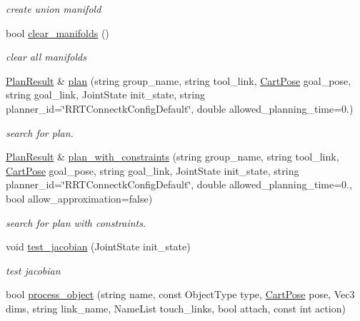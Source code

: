 \begin{DoxyCompactItemize}
\begin{DoxyCompactList}\small\item\em create union manifold \end{DoxyCompactList}\item 
bool \hyperlink{class_r_n_b_1_1_moveit_compact_1_1_planner_aac7f1dd0ef403cf9dfaa81de8a355cbe}{clear\+\_\+manifolds} ()
\begin{DoxyCompactList}\small\item\em clear all manifolds \end{DoxyCompactList}\item 
\hyperlink{struct_r_n_b_1_1_moveit_compact_1_1_plan_result}{Plan\+Result} \& \hyperlink{class_r_n_b_1_1_moveit_compact_1_1_planner_a8600287d3616809c9587ce6e5bfe1861}{plan} (string group\+\_\+name, string tool\+\_\+link, \hyperlink{class_r_n_b_1_1_moveit_compact_1_1_cart_pose}{Cart\+Pose} goal\+\_\+pose, string goal\+\_\+link, Joint\+State init\+\_\+state, string planner\+\_\+id=\char`\"{}R\+R\+T\+Connectk\+Config\+Default\char`\"{}, double allowed\+\_\+planning\+\_\+time=0.)
\begin{DoxyCompactList}\small\item\em search for plan. \end{DoxyCompactList}\item 
\hyperlink{struct_r_n_b_1_1_moveit_compact_1_1_plan_result}{Plan\+Result} \& \hyperlink{class_r_n_b_1_1_moveit_compact_1_1_planner_a99f5b838a94452a04b5ea15ad6273026}{plan\+\_\+with\+\_\+constraints} (string group\+\_\+name, string tool\+\_\+link, \hyperlink{class_r_n_b_1_1_moveit_compact_1_1_cart_pose}{Cart\+Pose} goal\+\_\+pose, string goal\+\_\+link, Joint\+State init\+\_\+state, string planner\+\_\+id=\char`\"{}R\+R\+T\+Connectk\+Config\+Default\char`\"{}, double allowed\+\_\+planning\+\_\+time=0., bool allow\+\_\+approximation=false)
\begin{DoxyCompactList}\small\item\em search for plan with constraints. \end{DoxyCompactList}\item 
void \hyperlink{class_r_n_b_1_1_moveit_compact_1_1_planner_a859368ee133cab8466f06e46dc1c252a}{test\+\_\+jacobian} (Joint\+State init\+\_\+state)
\begin{DoxyCompactList}\small\item\em test jacobian \end{DoxyCompactList}\item 
bool \hyperlink{class_r_n_b_1_1_moveit_compact_1_1_planner_adb071291198eec7757985d1f4125e833}{process\+\_\+object} (string name, const Object\+Type type, \hyperlink{class_r_n_b_1_1_moveit_compact_1_1_cart_pose}{Cart\+Pose} pose, Vec3 dims, string link\+\_\+name, Name\+List touch\+\_\+links, bool attach, const int action)

\end{DoxyCompactItemize}
